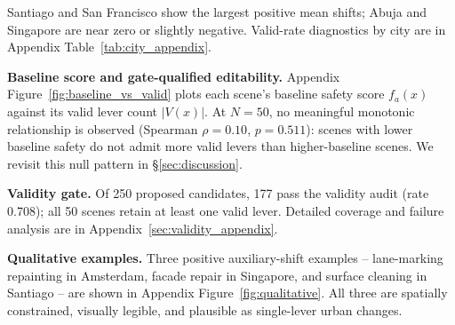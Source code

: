 \begin{table}[t]
  \centering
  \caption{City-level summary over the full $N{=}50$ run.
  Mean $\Delta_{\mathrm{aux}}$ and $\Delta_{\mathrm{aux}}$ [95\% CI]
  are computed over valid edits only. Coverage diagnostics are reported
  in Appendix Table~\ref{tab:city_appendix}.}
  \label{tab:cities}
  \scriptsize
\end{table}

Santiago and San Francisco show the largest positive mean shifts; Abuja
and Singapore are near zero or slightly negative. Valid-rate diagnostics
by city are in Appendix Table~\ref{tab:city_appendix}.

\noindent\textbf{Baseline score and gate-qualified editability.}
Appendix Figure~\ref{fig:baseline_vs_valid} plots each scene's baseline safety
score $f_a(x)$ against its valid lever count $|V(x)|$. At $N{=}50$, no
meaningful monotonic relationship is observed (Spearman
$\rho{=}0.10$, $p{=}0.511$): scenes with lower baseline safety do not
admit more valid levers than higher-baseline scenes. We revisit this
null pattern in \S\ref{sec:discussion}.

\noindent\textbf{Validity gate.}
Of 250 proposed candidates, 177 pass the validity audit (rate 0.708);
all 50 scenes retain at least one valid lever. Detailed coverage and
failure analysis are in Appendix~\ref{sec:validity_appendix}.

\noindent\textbf{Qualitative examples.}
Three positive auxiliary-shift examples -- lane-marking repainting
in Amsterdam, facade repair in Singapore, and surface cleaning in
Santiago -- are shown in Appendix Figure~\ref{fig:qualitative}. All
three are spatially constrained, visually legible, and plausible as
single-lever urban changes.
